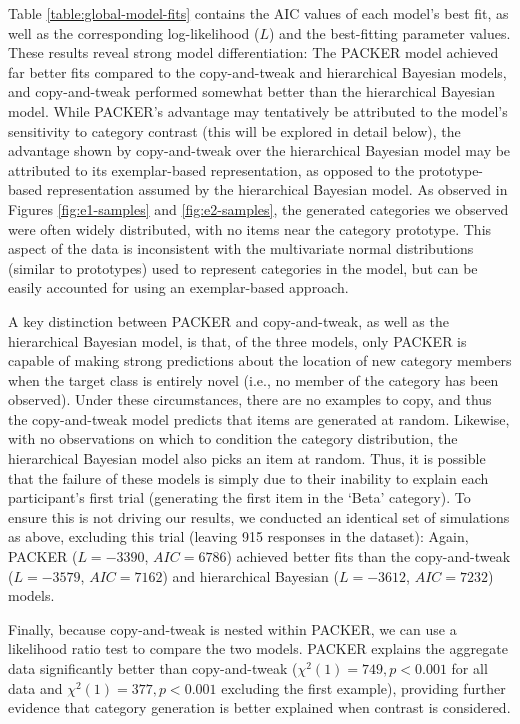 \documentclass[12pt]{article}
\begin{document}
\begin{flushleft}
Table \ref{table:global-model-fits} contains the AIC values of each model's best fit, as well as the corresponding log-likelihood ($L$) and the best-fitting parameter values. These results reveal strong model differentiation: The PACKER model achieved far better fits compared to the copy-and-tweak and hierarchical Bayesian models, and copy-and-tweak performed somewhat better than the hierarchical Bayesian model. While PACKER's advantage may tentatively be attributed to the model's sensitivity to category contrast (this will be explored in detail below), the advantage shown by copy-and-tweak over the hierarchical Bayesian model may be attributed to its exemplar-based representation, as opposed to the prototype-based representation assumed by the hierarchical Bayesian model. As observed in Figures \ref{fig:e1-samples} and \ref{fig:e2-samples}, the generated categories we observed were often widely distributed, with no items near the category prototype. This aspect of the data is inconsistent with the multivariate normal distributions (similar to prototypes) used to represent categories in the \cite{jern2013probabilistic} model, but can be easily accounted for using an exemplar-based approach. 

A key distinction between PACKER and copy-and-tweak, as well as the hierarchical Bayesian model, is that, of the three models, only PACKER is capable of making strong predictions about the location of new category members when the target class is entirely novel (i.e., no member of the category has been observed). Under these circumstances, there are no examples to copy, and thus the copy-and-tweak model predicts that items are generated at random. Likewise, with no observations on which to condition the  category distribution, the hierarchical Bayesian model also picks an item at random. Thus, it is possible that the failure of these models is simply due to their inability to explain each participant's first trial (generating the first item in the `Beta' category). To ensure this is not driving our results, we conducted an identical set of simulations as above, excluding this trial (leaving 915 responses in the dataset): Again, PACKER ($L = -3390$, $AIC = 6786$) achieved better fits than the copy-and-tweak ($L = -3579$, $AIC = 7162$) and hierarchical Bayesian ($L=-3612$, $AIC = 7232$) models. 

Finally, because copy-and-tweak is nested within PACKER, we can use a likelihood ratio test to compare the two models. PACKER explains the aggregate data significantly better than copy-and-tweak ($\chi^2(1) = 749, p < 0.001$ for all data and $\chi^2(1) = 377, p < 0.001$ excluding the first example), providing further evidence that category generation is better explained when contrast is considered.


\end{flushleft}
\end{document}
